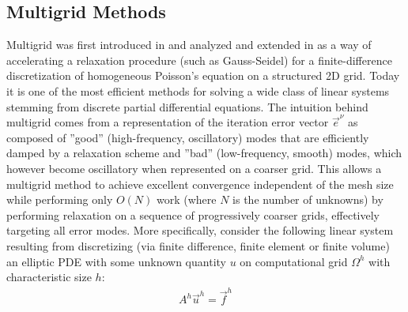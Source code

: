 \subsection{Multigrid Methods}
\label{subsec:related_work_multigrid}

Multigrid was first introduced in \cite{Fedorenko1962} and analyzed and extended in \cite{Fedorenko1964,Bakhvalov1966,Nicolaides1975,Brandt1977} as a way of accelerating a relaxation procedure (such as Gauss-Seidel) for a finite-difference discretization of homogeneous Poisson's equation on a structured 2D grid.   Today it is one of the most efficient methods for solving a wide class of linear systems stemming from discrete partial differential equations.   The intuition behind multigrid comes from a representation of the iteration error vector $\vec{e}^{\nu}$ as composed of ''good'' (high-frequency, oscillatory) modes that are efficiently damped by a relaxation scheme and ''bad'' (low-frequency, smooth) modes, which however become oscillatory when represented on a coarser grid.   This allows a multigrid method to achieve excellent convergence independent of the mesh size while performing only $O(N)$ work (where $N$ is the number of unknowns) by performing relaxation on a sequence of progressively coarser grids, effectively targeting all error modes.   More specifically, consider the following linear system resulting from discretizing (via finite difference, finite element or finite volume) an elliptic PDE with some unknown quantity $u$ on computational grid $\Omega^h$ with characteristic size $h$:
\begin{align}
    A^h \vec{u}^h = \vec{f}^h
\end{align}

